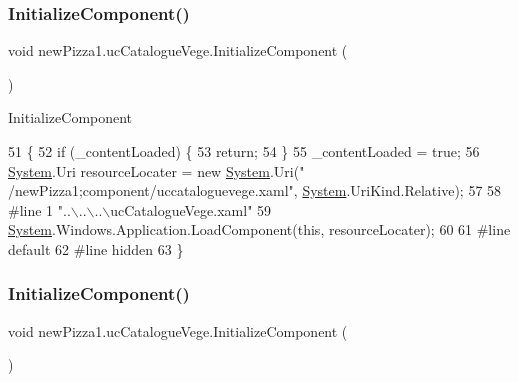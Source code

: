\subsubsection{\texorpdfstring{Initialize\+Component()}{InitializeComponent()}\hspace{0.1cm}{\footnotesize\ttfamily [2/6]}}
{\footnotesize\ttfamily void new\+Pizza1.\+uc\+Catalogue\+Vege.\+Initialize\+Component (\begin{DoxyParamCaption}{ }\end{DoxyParamCaption})\hspace{0.3cm}{\ttfamily [inline]}}



Initialize\+Component 


\begin{DoxyCode}
51                                           \{
52             \textcolor{keywordflow}{if} (\_contentLoaded) \{
53                 \textcolor{keywordflow}{return};
54             \}
55             \_contentLoaded = \textcolor{keyword}{true};
56             \hyperlink{namespaceSystem}{System}.Uri resourceLocater = \textcolor{keyword}{new} \hyperlink{namespaceSystem}{System}.Uri(\textcolor{stringliteral}{"
      /newPizza1;component/uccataloguevege.xaml"}, \hyperlink{namespaceSystem}{System}.UriKind.Relative);
57             
58 \textcolor{preprocessor}{            #line 1 "..\(\backslash\)..\(\backslash\)..\(\backslash\)ucCatalogueVege.xaml"}
59             \hyperlink{namespaceSystem}{System}.Windows.Application.LoadComponent(\textcolor{keyword}{this}, resourceLocater);
60             
61 \textcolor{preprocessor}{            #line default}
62 \textcolor{preprocessor}{            #line hidden}
63         \}
\end{DoxyCode}
\mbox{\label{classnewPizza1_1_1ucCatalogueVege_afc2e8f9dfd99c8252e745a8636e230da}} 
\subsubsection{\texorpdfstring{Initialize\+Component()}{InitializeComponent()}\hspace{0.1cm}{\footnotesize\ttfamily [3/6]}}
{\footnotesize\ttfamily void new\+Pizza1.\+uc\+Catalogue\+Vege.\+Initialize\+Component (\begin{DoxyParamCaption}{ }\end{DoxyParamCaption})\hspace{0.3cm}{\ttfamily [inline]}}



